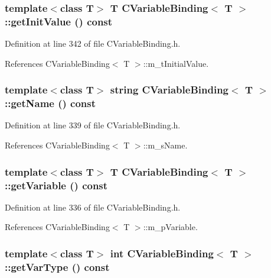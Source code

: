 \subsubsection{\setlength{\rightskip}{0pt plus 5cm}template$<$class T$>$ T CVariable\-Binding$<$ T $>$::get\-Init\-Value () const\hspace{0.3cm}{\tt  [inline]}}\label{classCVariableBinding_a5}




Definition at line 342 of file CVariable\-Binding.h.

References CVariable\-Binding$<$ T $>$::m\_\-t\-Initial\-Value.
\subsubsection{\setlength{\rightskip}{0pt plus 5cm}template$<$class T$>$ string CVariable\-Binding$<$ T $>$::get\-Name () const\hspace{0.3cm}{\tt  [inline]}}\label{classCVariableBinding_a4}




Definition at line 339 of file CVariable\-Binding.h.

References CVariable\-Binding$<$ T $>$::m\_\-s\-Name.
\subsubsection{\setlength{\rightskip}{0pt plus 5cm}template$<$class T$>$ T CVariable\-Binding$<$ T $>$::get\-Variable () const\hspace{0.3cm}{\tt  [inline]}}\label{classCVariableBinding_a3}




Definition at line 336 of file CVariable\-Binding.h.

References CVariable\-Binding$<$ T $>$::m\_\-p\-Variable.
\subsubsection{\setlength{\rightskip}{0pt plus 5cm}template$<$class T$>$ int CVariable\-Binding$<$ T $>$::get\-Var\-Type () const\hspace{0.3cm}{\tt  [inline]}}\label{classCVariableBinding_a6}




